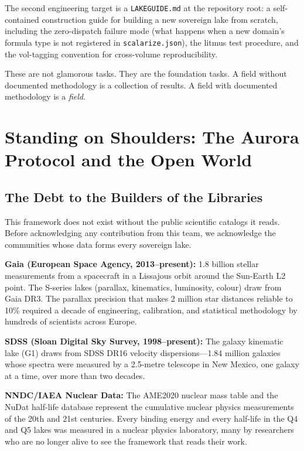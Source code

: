 \documentclass[11pt, letterpaper, openany]{book}
\begin{document}
The second engineering target is a \texttt{LAKEGUIDE.md} at the repository root:
a self-contained construction guide for building a new sovereign lake from scratch,
including the zero-dispatch failure mode (what happens when a new domain's formula
type is not registered in \texttt{scalarize.json}), the litmus test procedure, and
the vol-tagging convention for cross-volume reproducibility.

These are not glamorous tasks. They are the foundation tasks. A field without
documented methodology is a collection of results. A field with documented
methodology is a \emph{field}.

\clearpage

\chapter{Standing on Shoulders: The Aurora Protocol and the Open World}

\section{The Debt to the Builders of the Libraries}

This framework does not exist without the public scientific catalogs it reads.
Before acknowledging any contribution from this team, we acknowledge the
communities whose data forms every sovereign lake.

\textbf{Gaia (European Space Agency, 2013--present):} 1.8 billion stellar
measurements from a spacecraft in a Lissajous orbit around the Sun-Earth L2 point.
The S-series lakes (parallax, kinematics, luminosity, colour) draw from Gaia DR3.
The parallax precision that makes 2 million star distances reliable to 10\%
required a decade of engineering, calibration, and statistical methodology by
hundreds of scientists across Europe.

\textbf{SDSS (Sloan Digital Sky Survey, 1998--present):} The galaxy kinematic
lake (G1) draws from SDSS DR16 velocity dispersions---1.84 million galaxies
whose spectra were measured by a 2.5-metre telescope in New Mexico, one galaxy
at a time, over more than two decades.

\textbf{NNDC/IAEA Nuclear Data:} The AME2020 nuclear mass table and the NuDat
half-life database represent the cumulative nuclear physics measurements of the
20th and 21st centuries. Every binding energy and every half-life in the Q4 and
Q5 lakes was measured in a nuclear physics laboratory, many by researchers who
are no longer alive to see the framework that reads their work.
\end{document}
